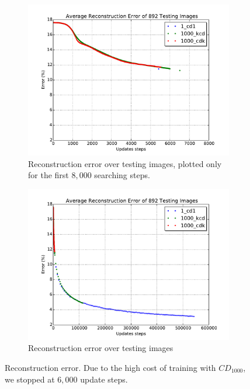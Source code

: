 \begin{figure}[hbt]
\begin{subfigure}[t]{0.4\textwidth}
			\includegraphics[width=\textwidth]{pics_sdbn/test_short.pdf}
		    \caption{Reconstruction error over testing images, plotted only for the first $8,000$ searching steps.}
		\end{subfigure}
		\begin{subfigure}[t]{0.4\textwidth}
			\includegraphics[width=\textwidth]{pics_sdbn/test_long.pdf}
		    \caption{Reconstruction error over testing images}
		\end{subfigure}

  \caption{
  Reconstruction error.
  Due to the high cost of training with $CD_{1000}$, we stopped at $6,000$ update steps.
  }
  \label{Fig:error}
\end{figure}

